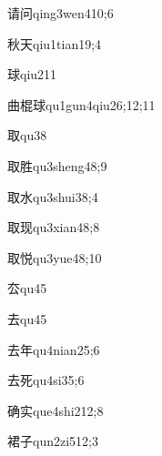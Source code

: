 \begin{verbete}{请问}{qing3wen4}{10;6}
\end{verbete}
\begin{verbete}{秋天}{qiu1tian1}{9;4}
\end{verbete}
\begin{verbete}{球}{qiu2}{11}
\end{verbete}
\begin{verbete}{曲棍球}{qu1gun4qiu2}{6;12;11}
\end{verbete}
\begin{verbete}{取}{qu3}{8}
\end{verbete}
\begin{verbete}{取胜}{qu3sheng4}{8;9}
\end{verbete}
\begin{verbete}{取水}{qu3shui3}{8;4}
\end{verbete}
\begin{verbete}{取现}{qu3xian4}{8;8}
\end{verbete}
\begin{verbete}{取悦}{qu3yue4}{8;10}
\end{verbete}
\begin{verbete}{厺}{qu4}{5}
\end{verbete}
\begin{verbete}{去}{qu4}{5}
\end{verbete}
\begin{verbete}{去年}{qu4nian2}{5;6}
\end{verbete}
\begin{verbete}{去死}{qu4si3}{5;6}
\end{verbete}
\begin{verbete}{确实}{que4shi2}{12;8}
\end{verbete}
\begin{verbete}{裙子}{qun2zi5}{12;3}
\end{verbete}

